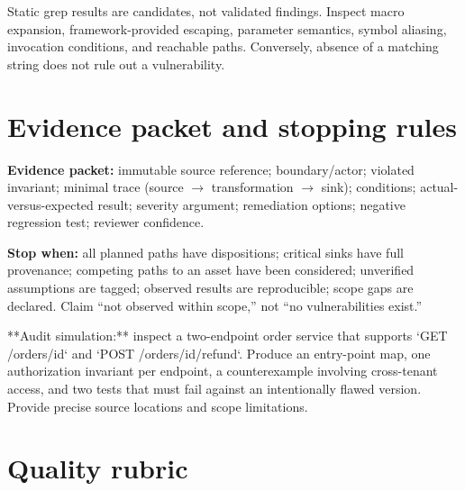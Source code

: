 \documentclass[
  letterpaper,
]{article}
\begin{document}
Static grep results are candidates, not validated findings. Inspect
macro expansion, framework-provided escaping, parameter semantics,
symbol aliasing, invocation conditions, and reachable paths. Conversely,
absence of a matching string does not rule out a vulnerability.

\section{Evidence packet and stopping
rules}\label{evidence-packet-and-stopping-rules}

\textbf{Evidence packet:} immutable source reference; boundary/actor;
violated invariant; minimal trace (source \(\to\) transformation \(\to\)
sink); conditions; actual-versus-expected result; severity argument;
remediation options; negative regression test; reviewer confidence.

\textbf{Stop when:} all planned paths have dispositions; critical sinks
have full provenance; competing paths to an asset have been considered;
unverified assumptions are tagged; observed results are reproducible;
scope gaps are declared. Claim ``not observed within scope,'' not ``no
vulnerabilities exist.''

\begin{fieldwork}
**Audit simulation:** inspect a two-endpoint order service that supports `GET /orders/{id}` and `POST /orders/{id}/refund`. Produce an entry-point map, one authorization invariant per endpoint, a counterexample involving cross-tenant access, and two tests that must fail against an intentionally flawed version. Provide precise source locations and scope limitations.
\end{fieldwork}

\section{Quality rubric}\label{quality-rubric}
\end{document}
